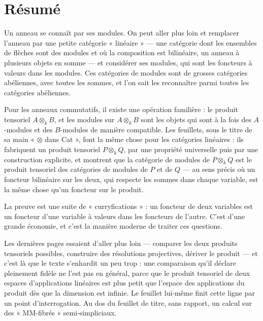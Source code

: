 \documentclass[11pt,a4paper]{article}
\begin{document}
\section*{Résumé}

\begin{resume}
Un anneau se connaît par ses modules. On peut aller plus loin et remplacer
l'anneau par une petite catégorie « linéaire » --- une catégorie dont les
ensembles de flèches sont des modules et où la composition est bilinéaire, un
anneau à plusieurs objets en somme --- et considérer ses modules, qui sont les
foncteurs à valeurs dans les modules. Ces catégories de modules sont de grosses
catégories abéliennes, avec toutes les sommes, et l'on sait les reconnaître
parmi toutes les catégories abéliennes.

Pour les anneaux commutatifs, il existe une opération familière : le produit
tensoriel $A \otimes_{k} B$, et les modules sur $A \otimes_{k} B$ sont les objets
qui sont à la fois des $A$-modules et des $B$-modules de manière compatible. Les
feuillets, sous le titre de sa main « $\otimes$ dans Cat », font la même chose
pour les catégories linéaires : ils fabriquent un produit tensoriel
$P \otimes_{k} Q$, par une propriété universelle puis par une construction
explicite, et montrent que la catégorie de modules de $P \otimes_{k} Q$ est le
produit tensoriel des catégories de modules de $P$ et de $Q$ --- au sens
précis où un foncteur bilinéaire sur les deux, qui respecte les sommes dans
chaque variable, est la même chose qu'un foncteur sur le produit.

La preuve est une suite de « curryfications » : un foncteur de deux variables
est un foncteur d'une variable à valeurs dans les foncteurs de l'autre. C'est
d'une grande économie, et c'est la manière moderne de traiter ces questions.

Les dernières pages essaient d'aller plus loin --- comparer les deux produits
tensoriels possibles, construire des résolutions projectives, dériver le
produit --- et c'est là que le texte s'enhardit un peu trop : une comparaison
qu'il déclare pleinement fidèle ne l'est pas en général, parce que le produit
tensoriel de deux espaces d'applications linéaires est plus petit que l'espace
des applications du produit dès que la dimension est infinie. Le feuillet
lui-même finit cette ligne par un point d'interrogation. Au dos du feuillet de
titre, sans rapport, un calcul sur des « MM-fibrés » semi-simpliciaux.

\end{resume}
\end{document}

